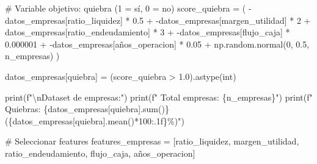 \documentclass[
  doc,
  floatsintext,
  longtable,
  a4paper,
  nolmodern,
  notxfonts,
  notimes,
  12pt,
  colorlinks=true,linkcolor=blue,citecolor=blue,urlcolor=blue]{apa7}
\newenvironment{Shaded}{\begin{snugshade}}{\end{snugshade}}
\newcommand{\BuiltInTok}[1]{\textcolor[rgb]{0.00,0.23,0.31}{#1}}
\newcommand{\CharTok}[1]{\textcolor[rgb]{0.13,0.47,0.30}{#1}}
\newcommand{\CommentTok}[1]{\textcolor[rgb]{0.37,0.37,0.37}{#1}}
\newcommand{\DecValTok}[1]{\textcolor[rgb]{0.68,0.00,0.00}{#1}}
\newcommand{\FloatTok}[1]{\textcolor[rgb]{0.68,0.00,0.00}{#1}}
\newcommand{\NormalTok}[1]{\textcolor[rgb]{0.00,0.23,0.31}{#1}}
\newcommand{\OperatorTok}[1]{\textcolor[rgb]{0.37,0.37,0.37}{#1}}
\newcommand{\SpecialCharTok}[1]{\textcolor[rgb]{0.37,0.37,0.37}{#1}}
\newcommand{\SpecialStringTok}[1]{\textcolor[rgb]{0.13,0.47,0.30}{#1}}
\newcommand{\StringTok}[1]{\textcolor[rgb]{0.13,0.47,0.30}{#1}}
\begin{document}
\begin{Shaded}
\begin{Highlighting}[]
\CommentTok{\# Variable objetivo: quiebra (1 = sí, 0 = no)}
\NormalTok{score\_quiebra }\OperatorTok{=}\NormalTok{ (}
    \OperatorTok{{-}}\NormalTok{datos\_empresas[}\StringTok{\textquotesingle{}ratio\_liquidez\textquotesingle{}}\NormalTok{] }\OperatorTok{*} \FloatTok{0.5} \OperatorTok{+}
    \OperatorTok{{-}}\NormalTok{datos\_empresas[}\StringTok{\textquotesingle{}margen\_utilidad\textquotesingle{}}\NormalTok{] }\OperatorTok{*} \DecValTok{2} \OperatorTok{+}
\NormalTok{    datos\_empresas[}\StringTok{\textquotesingle{}ratio\_endeudamiento\textquotesingle{}}\NormalTok{] }\OperatorTok{*} \DecValTok{3} \OperatorTok{+}
    \OperatorTok{{-}}\NormalTok{datos\_empresas[}\StringTok{\textquotesingle{}flujo\_caja\textquotesingle{}}\NormalTok{] }\OperatorTok{*} \FloatTok{0.000001} \OperatorTok{+}
    \OperatorTok{{-}}\NormalTok{datos\_empresas[}\StringTok{\textquotesingle{}años\_operacion\textquotesingle{}}\NormalTok{] }\OperatorTok{*} \FloatTok{0.05} \OperatorTok{+}
\NormalTok{    np.random.normal(}\DecValTok{0}\NormalTok{, }\FloatTok{0.5}\NormalTok{, n\_empresas)}
\NormalTok{)}

\NormalTok{datos\_empresas[}\StringTok{\textquotesingle{}quiebra\textquotesingle{}}\NormalTok{] }\OperatorTok{=}\NormalTok{ (score\_quiebra }\OperatorTok{\textgreater{}} \FloatTok{1.0}\NormalTok{).astype(}\BuiltInTok{int}\NormalTok{)}

\BuiltInTok{print}\NormalTok{(}\SpecialStringTok{f"}\CharTok{\textbackslash{}n}\SpecialStringTok{Dataset de empresas:"}\NormalTok{)}
\BuiltInTok{print}\NormalTok{(}\SpecialStringTok{f"  Total empresas: }\SpecialCharTok{\{}\NormalTok{n\_empresas}\SpecialCharTok{\}}\SpecialStringTok{"}\NormalTok{)}
\BuiltInTok{print}\NormalTok{(}\SpecialStringTok{f"  Quiebras: }\SpecialCharTok{\{}\NormalTok{datos\_empresas[}\StringTok{\textquotesingle{}quiebra\textquotesingle{}}\NormalTok{]}\SpecialCharTok{.}\BuiltInTok{sum}\NormalTok{()}\SpecialCharTok{\}}\SpecialStringTok{ (}\SpecialCharTok{\{}\NormalTok{datos\_empresas[}\StringTok{\textquotesingle{}quiebra\textquotesingle{}}\NormalTok{]}\SpecialCharTok{.}\NormalTok{mean()}\OperatorTok{*}\DecValTok{100}\SpecialCharTok{:.1f\}}\SpecialStringTok{\%)"}\NormalTok{)}

\CommentTok{\# Seleccionar features}
\NormalTok{features\_empresas }\OperatorTok{=}\NormalTok{ [}\StringTok{\textquotesingle{}ratio\_liquidez\textquotesingle{}}\NormalTok{, }\StringTok{\textquotesingle{}margen\_utilidad\textquotesingle{}}\NormalTok{, }\StringTok{\textquotesingle{}ratio\_endeudamiento\textquotesingle{}}\NormalTok{,}
                     \StringTok{\textquotesingle{}flujo\_caja\textquotesingle{}}\NormalTok{, }\StringTok{\textquotesingle{}años\_operacion\textquotesingle{}}\NormalTok{]}


\end{Highlighting}
\end{Shaded}
\end{document}
